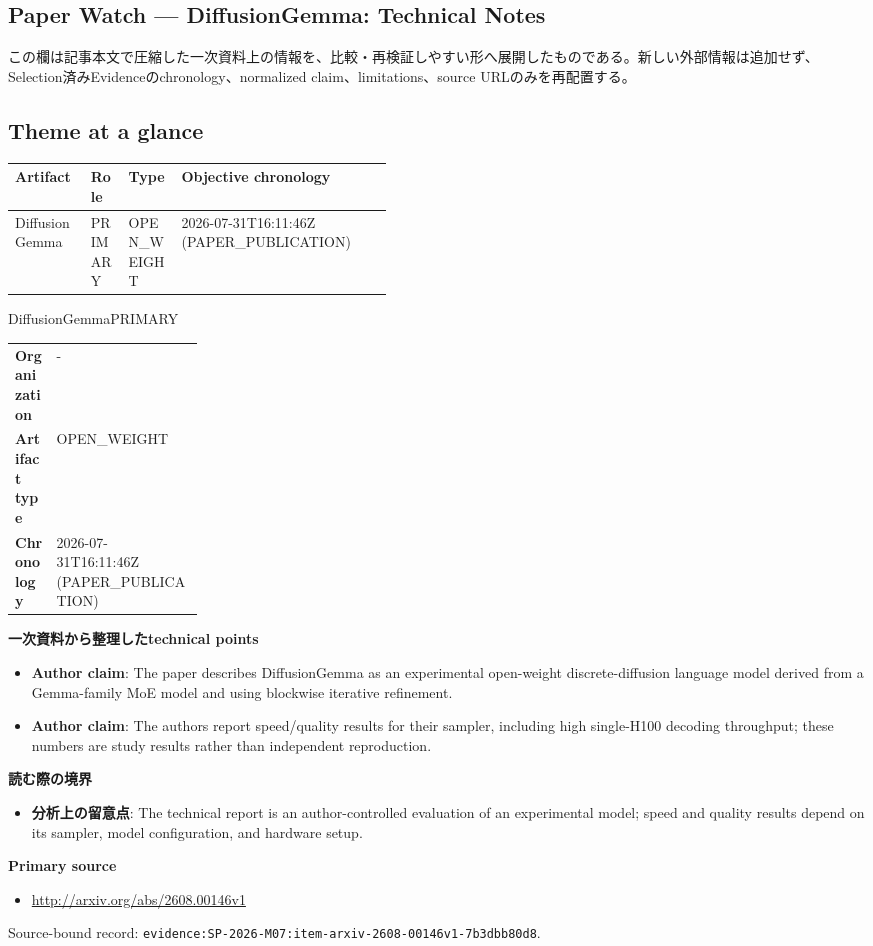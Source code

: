 \clearpage
{}
\subsection*{Paper Watch — DiffusionGemma: Technical Notes}
この欄は記事本文で圧縮した一次資料上の情報を、比較・再検証しやすい形へ展開したものである。新しい外部情報は追加せず、Selection済みEvidenceのchronology、normalized claim、limitations、source URLのみを再配置する。
\medskip
\subsection*{Theme at a glance}
\begin{center}
\footnotesize
\begin{tabularx}{\linewidth}{@{}p{0.20\linewidth}p{0.10\linewidth}p{0.14\linewidth}X@{}}
\toprule
Artifact & Role & Type & Objective chronology \\
\midrule
DiffusionGemma & PRIMARY & OPEN\_WEIGHT & 2026-07-31T16:11:46Z (PAPER\_PUBLICATION) \\
\bottomrule
\end{tabularx}
\end{center}
\normalsize

\begin{technicalnote}{DiffusionGemma}{PRIMARY}
\begin{tabularx}{\linewidth}{@{}>{\bfseries}p{0.22\linewidth}X@{}}
Organization & - \\
Artifact type & OPEN\_WEIGHT \\
Chronology & 2026-07-31T16:11:46Z (PAPER\_PUBLICATION) \\
\end{tabularx}
\smallskip
{\bfseries 一次資料から整理したtechnical points}
\begin{itemize}[leftmargin=1.5em,itemsep=0.35em]
\item \textbf{Author claim}: The paper describes DiffusionGemma as an experimental open-weight discrete-diffusion language model derived from a Gemma-family MoE model and using blockwise iterative refinement.
\item \textbf{Author claim}: The authors report speed/quality results for their sampler, including high single-H100 decoding throughput; these numbers are study results rather than independent reproduction.
\end{itemize}
{\bfseries 読む際の境界}
\begin{itemize}[leftmargin=1.5em,itemsep=0.35em]
\item \textbf{分析上の留意点}: The technical report is an author-controlled evaluation of an experimental model; speed and quality results depend on its sampler, model configuration, and hardware setup.
\end{itemize}
{\bfseries Primary source}
\begin{itemize}[leftmargin=1.5em,itemsep=0.25em]
\item \url{http://arxiv.org/abs/2608.00146v1}
\end{itemize}
{\scriptsize\color{SurveyMuted}Source-bound record: \texttt{evidence:SP-2026-M07:item-arxiv-2608-00146v1-7b3dbb80d8}.}
\end{technicalnote}
\medskip

